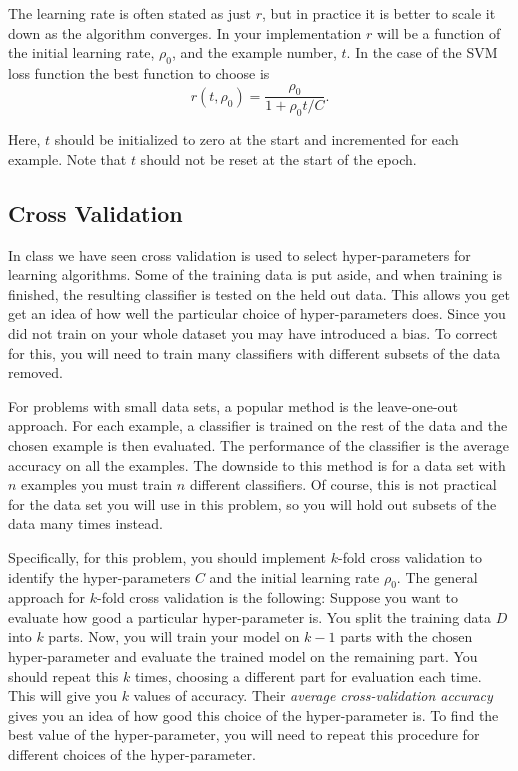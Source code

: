 The learning rate is often stated as just $r$, but in practice it is
better to scale it down as the algorithm converges. In your
implementation $r$ will be a function of the initial learning rate,
$\rho_0$, and the example number, $t$. In the case of the SVM loss
function the best function to choose is
$$ r(t, \rho_0) = \frac{\rho_0}{1 + \rho_0t/C}.$$

Here, $t$ should be initialized to zero at the start and incremented
for each example. Note that $t$ should not be reset at the start of
the epoch.

\subsection*{Cross Validation}
In class we have seen cross validation is used to select hyper-parameters for learning
algorithms. Some of the training data is put
aside, and when training is finished, the resulting classifier is
tested on the held out data. This allows you get get an idea of how
well the particular choice of hyper-parameters does. Since you did not
train on your whole dataset you may have introduced a bias. To correct
for this, you will need to train many classifiers with different
subsets of the data removed.

For problems with small data sets, a popular method is the
leave-one-out approach. For each example, a classifier is trained on
the rest of the data and the chosen example is then evaluated. The
performance of the classifier is the average accuracy on all the
examples. The downside to this method is for a data set with $n$
examples you must train $n$ different classifiers. Of course, this is
not practical for the data set you will use in this problem, so you
will hold out subsets of the data many times instead.

Specifically, for this problem, you should implement $k$-fold cross
validation to identify the hyper-parameters $C$ and the initial
learning rate $\rho_0$. The general approach for $k$-fold cross validation is
the following: Suppose you want to evaluate how good a particular
hyper-parameter is. You split the training data $D$ into $k$ parts.
Now, you will train your model on $k-1$ parts with the chosen
hyper-parameter and evaluate the trained model on the remaining part.
You should repeat this $k$ times, choosing a different part for
evaluation each time. This will give you $k$ values of accuracy. Their
{\em average cross-validation accuracy} gives you an idea of how good
this choice of the hyper-parameter is. To find the best value of the
hyper-parameter, you will need to repeat this procedure for different
choices of the hyper-parameter.

